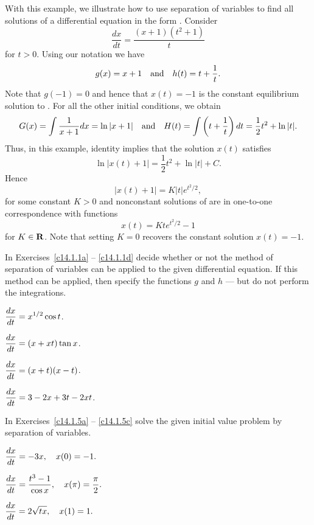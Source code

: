With this example, we illustrate how to use separation of variables to find 
all solutions of a differential equation in the form .  Consider
\begin{equation} \label{eq:x1t2}
\frac{dx}{dt} = \frac{(x+1)(t^2+1)}{t}
\end{equation}
for $t>0$.  Using our notation we have 
\[
g(x) = x+1 \quad\mbox{and}\quad h(t) = t+\frac{1}{t}.
\]
Note that $g(-1)=0$ and hence that $x(t)=-1$ is the constant equilibrium 
solution to .  For all the other initial conditions, we obtain 
\[
G(x)=\int \frac{1}{x+1} dx = \ln|x+1| \quad\mbox{and}\quad 
H(t) = \int\left(t + \frac{1}{t}\right)dt = \frac{1}{2}t^2 + \ln |t|.
\]
Thus, in this example, identity  implies that the 
solution $x(t)$ satisfies
\[
\ln |x(t)+1| = \frac{1}{2}t^2 + \ln |t| + C.
\]
Hence
\[
|x(t)+1| = K|t|e^{t^2/2},
\]
for some constant $K>0$ and nonconstant solutions of  are in 
one-to-one correspondence with functions
\[
x(t) = Kte^{t^2/2}-1
\]
for $K\in\mbox{$\bf{R}$}$.  Note that setting $K=0$ recovers the constant solution 
$x(t)=-1$.

\EXER

\TEXER

\noindent In Exercises~\ref{c14.1.1a} -- \ref{c14.1.1d} decide whether 
or not the method of separation of variables can be applied to the given
differential equation.  If this method can be applied, then specify the 
functions $g$ and $h$ --- but do not perform the integrations.
\begin{exercise} \label{c14.1.1a}
$\displaystyle \frac{dx}{dt} = x^{1/2}\cos t$.
\end{exercise}
\begin{exercise} \label{c14.1.1b}
$\displaystyle \frac{dx}{dt} = (x+xt)\tan x$.
\end{exercise}
\begin{exercise} \label{c14.1.1c}
$\displaystyle \frac{dx}{dt} = (x+t)(x-t)$.
\end{exercise}
\begin{exercise} \label{c14.1.1d}
$\displaystyle \frac{dx}{dt} = 3-2x+3t-2xt$.
\end{exercise}

\noindent In Exercises~\ref{c14.1.5a} -- \ref{c14.1.5c} solve the given 
initial value problem by separation of variables. 
\begin{exercise}  \label{c14.1.5a}
$\displaystyle \frac{dx}{dt} = -3x,\quad x(0)=-1.$
\end{exercise}
\begin{exercise}  \label{c14.1.5b}
$\displaystyle \frac{dx}{dt} = \frac{t^3-1}{\cos x},
\quad x(\pi)=\frac{\pi}{2}.$
\end{exercise}
\begin{exercise}  \label{c14.1.5c}
$\displaystyle \frac{dx}{dt} = 2\sqrt{tx},\quad x(1)=1.$
\end{exercise}

